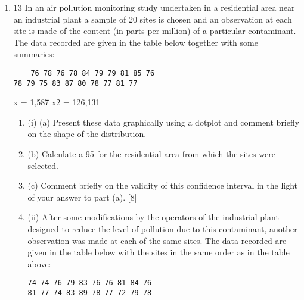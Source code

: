 \documentclass[a4paper,12pt]{article}
\begin{document}
\begin{enumerate}
\item
13 In an air pollution monitoring study undertaken in a residential area near an industrial
plant a sample of 20 sites is chosen and an observation at each site is made of the
content (in parts per million) of a particular contaminant. The data recorded are given
in the table below together with some summaries:
\begin{verbatim}
    76 78 76 78 84 79 79 81 85 76
78 79 75 83 87 80 78 77 81 77

\end{verbatim}

x = 1,587 
x2 = 126,131
\begin{enumerate}
    \item (i) (a) Present these data graphically using a dotplot and comment briefly on
the shape of the distribution.
    \item  (b) Calculate a 95%
for the residential area from which the sites were selected.
    \item (c) Comment briefly on the validity of this confidence interval in the light
of your answer to part (a). [8]
    \item  (ii) After some modifications by the operators of the industrial plant designed to
reduce the level of pollution due to this contaminant, another observation was
made at each of the same sites. The data recorded are given in the table below
with the sites in the same order as in the table above:
\begin{verbatim}
74 74 76 79 83 76 76 81 84 76
81 77 74 83 89 78 77 72 79 78
\end{verbatim}

\end{enumerate}


\end{enumerate}
\end{document}
